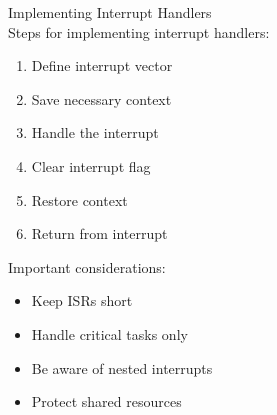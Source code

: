 \begin{KR}{Implementing Interrupt Handlers}\\
Steps for implementing interrupt handlers:
\begin{enumerate}
  \item Define interrupt vector
  \item Save necessary context
  \item Handle the interrupt
  \item Clear interrupt flag
  \item Restore context
  \item Return from interrupt
\end{enumerate}

Important considerations:
\begin{itemize}
  \item Keep ISRs short
  \item Handle critical tasks only
  \item Be aware of nested interrupts
  \item Protect shared resources
\end{itemize}
\end{KR}
